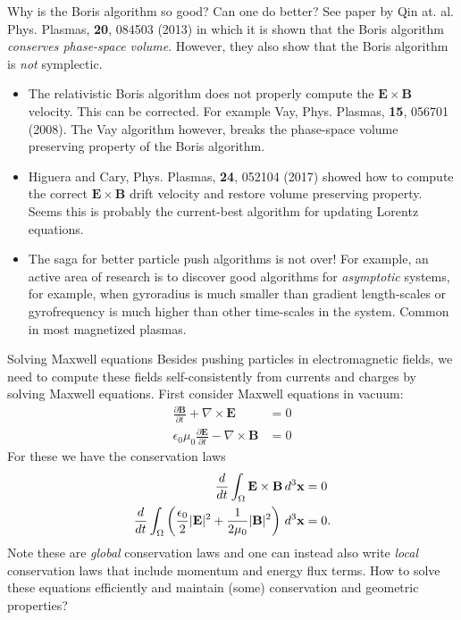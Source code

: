 \documentclass[pdf]{beamer}
\newcommand{\mvec}[1]{\mathbf{#1}}
\newcommand{\dtx}{\thinspace d^3\mvec{x}}
\theoremstyle{definition}
\begin{document}
\begin{frame}{Why is the Boris algorithm so good? Can one do better?}
  \small%
  See paper by Qin at. al. Phys. Plasmas, {\bf 20}, 084503 (2013) in
  which it is shown that the Boris algorithm \emph{conserves
    phase-space volume}. However, they also show that the Boris
  algorithm is \emph{not} symplectic.
  \begin{itemize}
  \item The relativistic Boris algorithm does not properly compute the
    $\mvec{E}\times\mvec{B}$ velocity. This can be corrected. For
    example Vay, Phys. Plasmas, {\bf 15}, 056701 (2008). The Vay
    algorithm however, breaks the phase-space volume preserving
    property of the Boris algorithm.
  \item Higuera and Cary, Phys. Plasmas, {\bf 24}, 052104 (2017)
    showed how to compute the correct $\mvec{E}\times\mvec{B}$ drift
    velocity and restore volume preserving property. Seems this is
    probably the current-best algorithm for updating Lorentz
    equations.
  \item The saga for better particle push algorithms is not over! For
    example, an active area of research is to discover good algorithms
    for \emph{asymptotic} systems, for example, when gyroradius is
    much smaller than gradient length-scales or gyrofrequency is much
    higher than other time-scales in the system. Common in most
    magnetized plasmas.
  \end{itemize}  
\end{frame}

\begin{frame}{Solving Maxwell equations}
  \small%
  Besides pushing particles in electromagnetic fields, we need to
  compute these fields self-consistently from currents and charges by
  solving Maxwell equations. First consider Maxwell equations in
  vacuum:
  \begin{align*}
    \frac{\partial \mvec{B}}{\partial t} + \nabla\times\mvec{E} &= 0 \\
    \epsilon_0\mu_0\frac{\partial \mvec{E}}{\partial t} -
    \nabla\times\mvec{B} &= 0
  \end{align*}
  For these we have the conservation laws
  \begin{align*}
    \frac{d}{dt} \int_\Omega \mvec{E}\times\mvec{B}  \dtx &= 0 \\
    \frac{d}{dt} \int_\Omega \left( \frac{\epsilon_0}{2} |\mvec{E}|^2 + \frac{1}{2\mu_0} |\mvec{B}|^2 \right) \dtx &= 0.
  \end{align*}
  Note these are \emph{global} conservation laws and one can instead
  also write \emph{local} conservation laws that include momentum and
  energy flux terms. How to solve these equations efficiently and
  maintain (some) conservation and geometric properties?
\end{frame}
\end{document}
